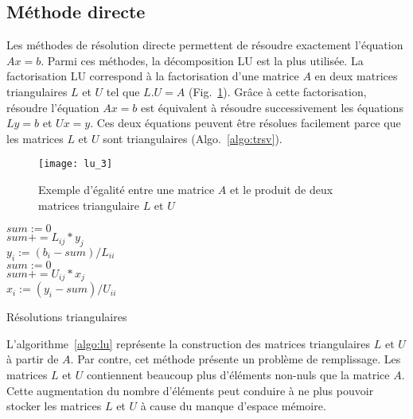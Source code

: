 \subsection{Méthode directe}
Les méthodes de résolution directe permettent de résoudre exactement l'équation $Ax=b$.
%
Parmi ces méthodes, la décomposition LU est la plus utilisée.
%
La factorisation LU correspond à la factorisation d'une matrice $A$ en deux matrices triangulaires $L$ et $U$ tel que $L.U=A$ (Fig.~\ref{fig:lu_3}).
%
Grâce à cette factorisation, résoudre l'équation $Ax=b$ est équivalent à résoudre successivement les équations $Ly=b$ et $Ux=y$.
%
Ces deux équations peuvent être résolues facilement parce que les matrices $L$ et $U$ sont triangulaires (Algo.~\ref{algo:trsv}).

\begin{figure}[!h]
  \centering
  \texttt{[image: lu\_3]}
  \caption{Exemple d'égalité entre une matrice $A$ et le produit de deux matrices triangulaire $L$ et $U$}
  \label{fig:lu_3}
\end{figure}

\begin{algorithm}
   {
    $sum := 0$\\
     {
      $sum += L_{ij} * y_j$ \\
    }
    $y_i := (b_i-sum)/L_{ii}$ \\
  }
   {
    $sum := 0$\\
     {
      $sum += U_{ij} * x_j$ \\
    }
    $x_i := (y_i-sum)/U_{ii}$ \\
  }
  \caption{Résolutions triangulaires}
  \label{algo:trsv}
\end{algorithm}

L'algorithme~\ref{algo:lu} représente la construction des matrices triangulaires $L$ et $U$ à partir de $A$.
%
Par contre, cet méthode présente un problème de remplissage.
%
Les matrices $L$ et $U$ contiennent beaucoup plus d'éléments non-nuls que la matrice $A$.
%
Cette augmentation du nombre d'éléments peut conduire à ne plus pouvoir stocker les matrices $L$ et $U$ à cause du manque d'espace mémoire.


